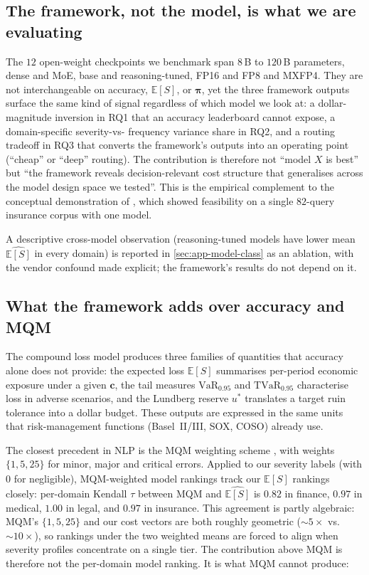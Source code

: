 \documentclass[11pt]{article}
\newcommand{\ES}{\mathbb{E}[S]}
\newcommand{\VaR}{\mathrm{VaR}}
\newcommand{\TVaR}{\mathrm{TVaR}}
\newcommand{\bpi}{\boldsymbol{\pi}}
\begin{document}
\subsection{The framework, not the model, is what we are evaluating}

The $12$ open-weight checkpoints we benchmark span $8$\,B to
$120$\,B parameters, dense and MoE, base and reasoning-tuned,
FP16 and FP8 and MXFP4. They are not interchangeable on
accuracy, $\ES$, or $\bpi$, yet the three framework outputs
surface the same kind of signal regardless of which model we
look at: a dollar-magnitude inversion in RQ1 that an accuracy
leaderboard cannot expose, a domain-specific severity-vs-
frequency variance share in RQ2, and a routing tradeoff in RQ3
that converts the framework's outputs into an operating point
(\enquote{cheap} or \enquote{deep} routing). The contribution is therefore
not \enquote{model $X$ is best} but \enquote{the framework reveals
decision-relevant cost structure that generalises across the
model design space we tested}. This is the empirical
complement to the conceptual demonstration of
\citet{beauchemin2026position}, which showed feasibility on a
single $82$-query insurance corpus with one model.

A descriptive cross-model observation (reasoning-tuned models
have lower mean $\widehat{\ES}$ in every domain) is reported in
\autoref{sec:app-model-class} as an ablation, with the vendor
confound made explicit; the framework's results do not depend
on it.

\subsection{What the framework adds over accuracy and MQM}

The compound loss model produces three families of quantities
that accuracy alone does not provide: the expected loss $\ES$
summarises per-period economic exposure under a given
$\mathbf{c}$, the tail measures $\VaR_{0.95}$ and $\TVaR_{0.95}$
characterise loss in adverse scenarios, and the Lundberg reserve
$u^\ast$ translates a target ruin tolerance into a dollar
budget. These outputs are expressed in the same units that
risk-management functions (Basel~II/III, SOX, COSO) already
use.

The closest precedent in NLP is the MQM weighting scheme
\citep{lommel2014mqm}, with weights $\{1, 5, 25\}$ for minor,
major and critical errors. Applied to our severity labels (with
$0$ for negligible), MQM-weighted model rankings track our
$\widehat{\ES}$ rankings closely: per-domain Kendall $\tau$
between MQM and $\widehat{\ES}$ is $0.82$ in finance, $0.97$ in
medical, $1.00$ in legal, and $0.97$ in insurance. This
agreement is partly algebraic: MQM's $\{1, 5, 25\}$ and our
cost vectors are both roughly geometric ($\sim 5\times$ vs.\
$\sim 10\times$), so rankings under the two weighted means are
forced to align when severity profiles concentrate on a single
tier. The contribution above MQM is therefore not the per-domain
model ranking. It is what MQM cannot produce:
\end{document}

